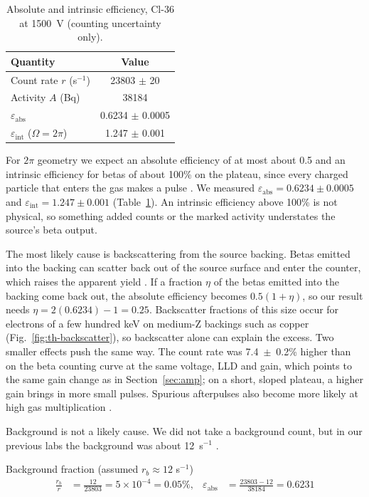 \documentclass[12pt]{article}
\begin{document}
\begin{table}[!htbp]
\centering\small
\begin{tabular}{lc}
\toprule
\textbf{Quantity} & \textbf{Value} \\
\midrule
Count rate $r$ (s$^{-1}$) & 23803 $\pm$ 20 \\
Activity $A$ (Bq) & 38184 \\
$\varepsilon_{\text{abs}}$ & 0.6234 $\pm$ 0.0005 \\
$\varepsilon_{\text{int}}$ ($\Omega = 2\pi$) & 1.247 $\pm$ 0.001 \\
\bottomrule
\end{tabular}
\caption{Absolute and intrinsic efficiency, Cl-36 at 1500~V (counting uncertainty only).}
\label{tab:eff}
\end{table}

For $2\pi$ geometry we expect an absolute efficiency of at most about 0.5 and an intrinsic efficiency for betas of about 100\% on the plateau, since every charged particle that enters the gas makes a pulse \cite{knoll}. We measured $\varepsilon_{\text{abs}} = 0.6234 \pm 0.0005$ and $\varepsilon_{\text{int}} = 1.247 \pm 0.001$ (Table~\ref{tab:eff}). An intrinsic efficiency above 100\% is not physical, so something added counts or the marked activity understates the source's beta output.

The most likely cause is backscattering from the source backing. Betas emitted into the backing can scatter back out of the source surface and enter the counter, which raises the apparent yield \cite{knoll}. If a fraction $\eta$ of the betas emitted into the backing come back out, the absolute efficiency becomes $0.5(1+\eta)$, so our result needs $\eta = 2(0.6234) - 1 = 0.25$. Backscatter fractions of this size occur for electrons of a few hundred keV on medium-Z backings such as copper (Fig.~\ref{fig:th-backscatter}), so backscatter alone can explain the excess. Two smaller effects push the same way. The count rate was 7.4~$\pm$~0.2\% higher than on the beta counting curve at the same voltage, LLD and gain, which points to the same gain change as in Section~\ref{sec:amp}; on a short, sloped plateau, a higher gain brings in more small pulses. Spurious afterpulses also become more likely at high gas multiplication \cite{knoll}.

Background is not a likely cause. We did not take a background count, but in our previous labs the background was about 12~s$^{-1}$ \cite{lab3}.

\begin{samplecalc}{Background fraction (assumed $r_b \approx 12$ s$^{-1}$)}
\begin{align*}
\frac{r_b}{r} &= \frac{12}{23803} = 5\times10^{-4} = 0.05\%, &
\varepsilon_{\text{abs}} &= \frac{23803 - 12}{38184} = 0.6231
\end{align*}
\end{samplecalc}
\end{document}
